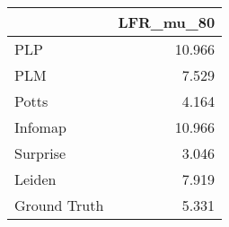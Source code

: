 \begin{tabular}{lr}
\toprule
{} & LFR_mu_80 \\
\midrule
PLP          &    10.966 \\
PLM          &     7.529 \\
Potts        &     4.164 \\
Infomap      &    10.966 \\
Surprise     &     3.046 \\
Leiden       &     7.919 \\
Ground Truth &     5.331 \\
\bottomrule
\end{tabular}

